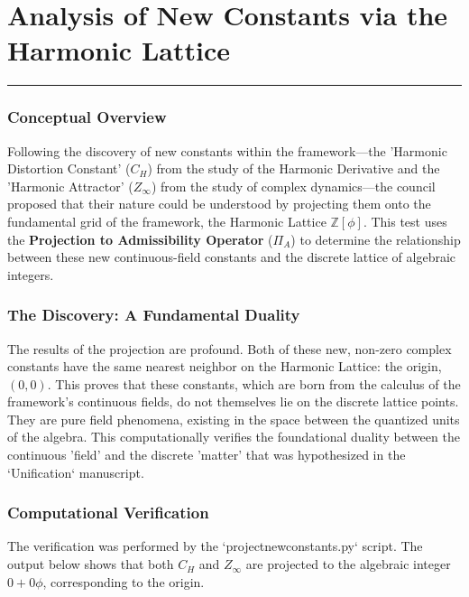 \section*{Analysis of New Constants via the Harmonic Lattice}
\hrule
\vspace{0.5cm}

\subsubsection*{Conceptual Overview}
Following the discovery of new constants within the framework—the 'Harmonic Distortion Constant' ($C_H$) from the study of the Harmonic Derivative and the 'Harmonic Attractor' ($Z_\infty$) from the study of complex dynamics—the council proposed that their nature could be understood by projecting them onto the fundamental grid of the framework, the Harmonic Lattice $\mathbb{Z}[\phi]$. This test uses the \textbf{Projection to Admissibility Operator} ($\Pi_A$) to determine the relationship between these new continuous-field constants and the discrete lattice of algebraic integers.

\subsubsection*{The Discovery: A Fundamental Duality}
The results of the projection are profound. Both of these new, non-zero complex constants have the same nearest neighbor on the Harmonic Lattice: the origin, $(0,0)$. This proves that these constants, which are born from the calculus of the framework's continuous fields, do not themselves lie on the discrete lattice points. They are pure field phenomena, existing in the space between the quantized units of the algebra. This computationally verifies the foundational duality between the continuous 'field' and the discrete 'matter' that was hypothesized in the `Unification` manuscript.

\subsubsection*{Computational Verification}
The verification was performed by the `projectnewconstants.py` script. The output below shows that both $C_H$ and $Z_\infty$ are projected to the algebraic integer $0+0\phi$, corresponding to the origin.


